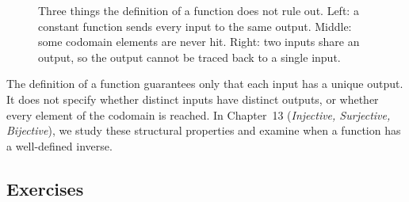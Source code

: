 \begin{figure}[htbp]
\caption{Three things the definition of a function does not rule out. Left: a constant function sends every input to the same output. Middle: some codomain elements are never hit. Right: two inputs share an output, so the output cannot be traced back to a single input.}
\label{fig:fn-three-gaps}
\end{figure}

The definition of a function guarantees only that each input has a unique output. It does not specify whether distinct inputs have distinct outputs, or whether every element of the codomain is reached. In Chapter~13 (\emph{Injective, Surjective, Bijective}), we study these structural properties and examine when a function has a well-defined inverse.

\subsection{Exercises}

